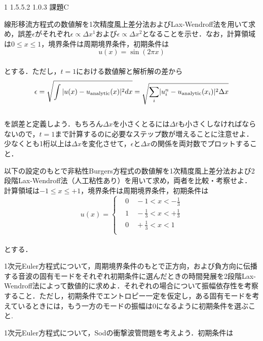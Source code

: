 \documentclass[10pt,a4j]{jarticle}
\makeatletter
\renewcommand{\labelenumi}{(-\arabic{enumi})}
\renewenvironment{enumerate}%
{%
\begin{list}{(\arabic{enumi})}
{%
  \usecounter{enumi}
  \setlength{\topsep}{0.0em}
  \setlength{\parskip}{0.0em}
  \setlength{\parsep}{0.0em}
  \setlength{\itemsep}{0.25em}
  \setlength{\itemindent}{1zw}
  \setlength{\leftmargin}{2zw}
  \setlength{\rightmargin}{0zw}
  \setlength{\labelsep}{0.5zw}
  \setlength{\labelwidth}{1zw}
  \setlength{\listparindent}{0zw}
}
}{%
\end{list}%
}
\renewcommand{\section}{\@startsection{section}%
   {1}%
   {\z@}%
   {1.5\Cvs \@plus.5\Cvs \@minus.2\Cvs}%
   {1.0\Cvs \@plus.3\Cvs}%
   {\centering\normalfont\LARGE\bfseries}}%
\makeatother
\begin{document}
\hypertarget{ux8ab2ux984cc}{%
\section{課題C}\label{ux8ab2ux984cc}}

\begin{enumerate}
\def\labelenumi{.}
\item
  線形移流方程式の数値解を1次精度風上差分法およびLax-Wendroff法を用いて求め，誤差\(\epsilon\)がそれぞれ\(\epsilon \propto \Delta x^1\)および\(\epsilon \propto \Delta x^2\)となることを示せ．なお，計算領域は\(0 \leq x \leq 1\)，境界条件は周期境界条件，初期条件は\\
  \[
  u(x) = \sin \left ( 2 \pi x \right)
  \]\\
  とする．ただし，\(t = 1\)における数値解と解析解の差から\\
  \[
  \epsilon =
  \sqrt{ \int \vert u(x) - u_{\rm analytic}(x) \rvert^2 dx} =
  \sqrt{ \sum_{i} \lvert u_{i}^{n} - u_{\rm analytic}(x_i) \rvert^2 \Delta x}
  \]\\
  を誤差と定義しよう．もちろん\(\Delta x\)を小さくとるには\(\Delta t\)も小さくしなければならないので，\(t = 1\)まで計算するのに必要なステップ数が増えることに注意せよ．少なくとも1桁以上は\(\Delta x\)を変化させて，\(\epsilon\)と\(\Delta x\)の関係を両対数でプロットすること．
\item
  以下の設定のもとで非粘性Burgers方程式の数値解を1次精度風上差分法および2段階Lax-Wendroff法（人工粘性あり）を用いて求め，両者を比較・考察せよ．\\
  計算領域は\(-1 \leq x \leq +1\)，境界条件は周期境界条件，初期条件は\\
  \[
  u(x) =
  \begin{cases}
  & 0 \quad -1 < x < -\frac{1}{3} \\
  & 1 \quad -\frac{1}{3} < x < +\frac{1}{3} \\
  & 0 \quad +\frac{1}{3} < x < 1 \\
  \end{cases}
  \]\\
  とする．
\item
  1次元Euler方程式について，周期境界条件のもとで正方向，および負方向に伝播する音波の固有モードをそれぞれ初期条件に選んだときの時間発展を2段階Lax-Wendroff法によって数値的に求めよ．それぞれの場合について振幅依存性を考察すること．ただし，初期条件でエントロピー一定を仮定し，ある固有モードを考えているときには，もう一方のモードの振幅は0になるように初期条件を選ぶこと.
\item
  1次元Euler方程式について，Sodの衝撃波管問題を考えよう．初期条件は\\

\end{enumerate}
\end{document}
